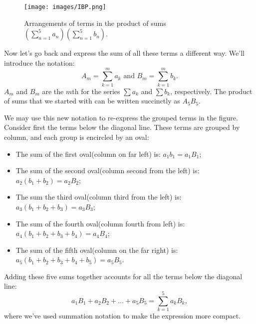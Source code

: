 \begin{figure}[htb]
\begin{center}
	\texttt{[image: images/IBP.png]}
\caption{\label{fig:IBP} Arrangements of terms in the product of sums $\left( \sum_{n=1}^{5}a_{n} \right) \left( \sum_{n=1}^{5}b_{n} \right)$.}
\end{center}
\end{figure} 


Now let's go back and express the sum of all these terms a different way. We'll introduce the notation:
\[ A_{m}= \sum_{k=1}^{m}a_{k} \text{ and } B_{m}= \sum_{k=1}^{m}b_{k}. \]
$A_m$ and $B_m$ are the $m$th  for the series $\sum a_k$ and $\sum b_k$, respectively.
The product of sums that we started with can be written succinctly as $A_{5}B_{5}$. 

We may use this new notation to 
re-express the grouped terms in the figure. 
Consider first the terms below the diagonal line. These terms are grouped by column, and each group is encircled by an oval:
\begin{itemize}
\item
The sum of the first oval(column on far left) is: $a_{1}b_{1}= a_{1}B_{1}$;
 \item
The sum of the second oval(column second from the left) is: $a_{2}\left ( b_{1}+b_{2} \right )= a_{2}B_{2}$;
\item
The sum the third oval(column third from the left) is: $a_{3}\left ( b_{1}+b_{2}+b_{3} \right )= a_{3}B_{3}$;
\item
The sum of the fourth oval(column fourth from left) is: $a_{4}\left ( b_{1}+b_{2}+b_{3}+b_{4} \right )= a_{4}B_{4}$;
\item 
The sum of the fifth oval(column on the far right) is: $a_{5}\left (b _{1}+b_{2}+b_{3}+b_{4}+b_{5} \right )=a _{5}B_{5}$.
\end{itemize}
Adding these five sums together accounts for all the terms below the diagonal line:
\[ a_1B_1 + a_2B_2 + \ldots + a_5B_5 = \sum_{k=1}^{5}a_kB_k,\]
where we've used summation notation to make the expression more compact.

